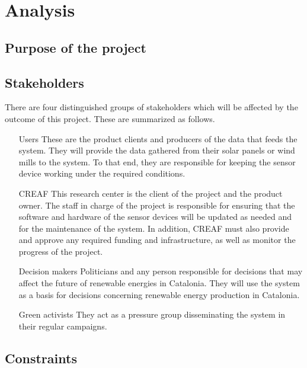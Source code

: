 \chapter{Analysis}

\section{Purpose of the project}
\section{Stakeholders}

There are four distinguished groups of stakeholders which will be affected by the outcome of this project. These are summarized as follows.

\begin{enumerate}
\item[Users] These are the product clients and producers of the data that feeds the system. They will provide the data gathered from their solar panels or wind mills to the system. To that end, they are responsible for keeping the sensor device working under the required conditions.
\item[CREAF] This research center is the client of the project and the product owner. The staff in charge of the project is responsible for ensuring that the software and hardware of the sensor devices will be updated as needed and for the maintenance of the system. In addition, CREAF must also provide and approve any required funding and infrastructure, as well as monitor the progress of the project.
\item[Decision makers] Politicians and any person responsible for decisions that may affect the future of renewable energies in Catalonia. They will use the system as a basis for decisions concerning renewable energy production in Catalonia.
\item[Green activists] They act as a pressure group disseminating the system in their regular campaigns.
\end{enumerate}

\section{Constraints}
